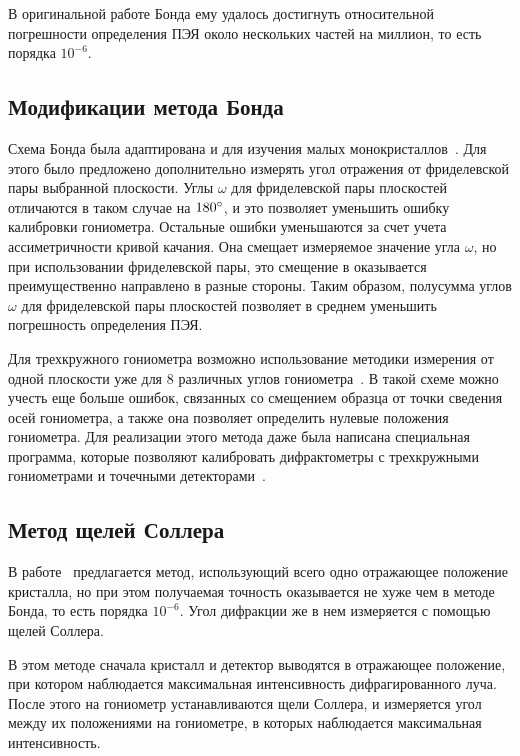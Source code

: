 В оригинальной работе Бонда ему удалось достигнуть относительной погрешности определения ПЭЯ около нескольких частей на миллион, то есть порядка $10^{-6}$.

\subsection{Модификации метода Бонда}

Схема Бонда была адаптирована и для изучения малых монокристаллов~\cite{Hubbard:1976,Ponomarev:1969}.
Для этого было предложено дополнительно измерять угол отражения от фриделевской пары выбранной плоскости.
Углы $\omega$ для фриделевской пары плоскостей отличаются в таком случае на $180^\circ$, и это позволяет уменьшить ошибку калибровки гониометра.
Остальные ошибки уменьшаются за счет учета ассиметричности кривой качания.
Она смещает измеряемое значение угла $\omega$, но при использовании фриделевской пары, это смещение в оказывается преимущественно направлено в разные стороны.
Таким образом, полусумма углов $\omega$ для фриделевской пары плоскостей позволяет в среднем уменьшить погрешность определения ПЭЯ.

Для трехкружного гониометра возможно использование методики измерения от одной плоскости уже для 8 различных углов гониометра~\cite{King:1979}.
В такой схеме можно учесть еще больше ошибок, связанных со смещением образца от точки сведения осей гониометра, а также она позволяет определить нулевые положения гониометра.
Для реализации этого метода даже была написана специальная программа, которые позволяют калибровать дифрактометры с трехкружными гониометрами и точечными детекторами~\cite{Angel:2011}.

\subsection{Метод щелей Соллера}

В работе~\cite{Berger:1984} предлагается метод, использующий всего одно отражающее положение кристалла, но при этом получаемая точность оказывается не хуже чем в методе Бонда, то есть порядка $10^{-6}$.
Угол дифракции же в нем измеряется с помощью щелей Соллера.

В этом методе сначала кристалл и детектор выводятся в отражающее положение, при котором наблюдается максимальная интенсивность дифрагированного луча.
После этого на гониометр устанавливаются щели Соллера, и измеряется угол между их положениями на гониометре, в которых наблюдается максимальная интенсивность.

